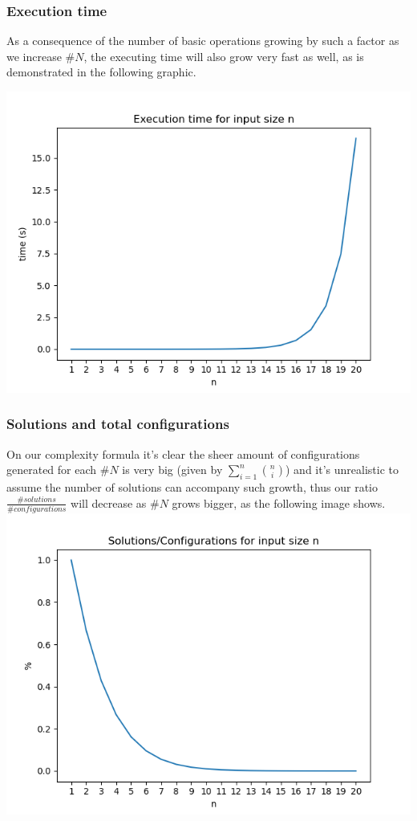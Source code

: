 \documentclass[...]{revdetua}
\begin{document}
\subsubsection{Execution time}
As a consequence of the number of basic operations growing by such a factor as we increase $\#N$, the executing time will also grow very fast as well, as is demonstrated in the following graphic.

\includegraphics[scale=0.5]{exe_time.png}
\subsubsection{Solutions and total configurations}
On our complexity formula it's clear the sheer amount of configurations generated for each $\#N$ is very big (given by $\sum_{i=1}^{n}{{n}\choose{i}}$) and it's unrealistic to assume the number of solutions can accompany such growth, thus our ratio $\frac{\#solutions}{\#configurations}$ will decrease as $\#N$ grows bigger, as the following image shows.
\includegraphics[scale=0.5]{solconfig.png}
\end{document}
